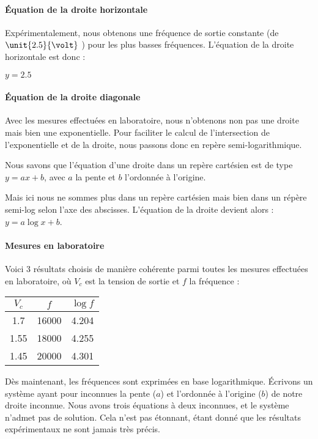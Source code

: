 \paragraph{Équation de la droite horizontale}
Expérimentalement, nous obtenons une fréquence de sortie constante (de $\unit{2.5}{\volt}$ )
pour les plus basses fréquences. L'équation de la droite horizontale est donc :

$y=2.5$

\paragraph{Équation de la droite diagonale}

Avec les mesures effectuées en laboratoire, nous n'obtenons non pas une droite mais bien une exponentielle.
Pour faciliter le calcul de l'intersection de l'exponentielle et de la droite, nous passons donc en repère
semi-logarithmique.

Nous savons que l'équation d'une droite dans un repère cartésien est de type $y=ax+b$, avec $a$ la pente
et $b$ l'ordonnée à l'origine.

Mais ici nous ne sommes plus dans un repère cartésien mais bien dans un répère semi-log selon l'axe des
abscisses. L'équation de la droite devient alors : $y=a\log{x}+b$.

\paragraph{Mesures en laboratoire}

Voici 3 résultats choisis de manière cohérente parmi toutes les mesures effectuées en laboratoire, où
$V_c$ est la tension de sortie et $f$ la fréquence :

\begin{center}
\begin{tabular}{|c|c|c|}
\hline
$V_c$ & $f$ & $\log{f}$ \\
\hline
1.7 & 16000 & 4.204 \\
\hline
1.55 & 18000 & 4.255 \\
\hline
1.45 & 20000 & 4.301 \\
\hline
\end{tabular}
\end{center}

Dès maintenant, les fréquences sont exprimées en base logarithmique.
Écrivons un système ayant pour inconnues la pente ($a$) et l'ordonnée à l'origine ($b$) de notre droite
inconnue.
Nous avons trois équations à deux inconnues, et le système n'admet pas de solution.
Cela n'est pas étonnant, étant donné que les résultats expérimentaux ne sont jamais très précis.


